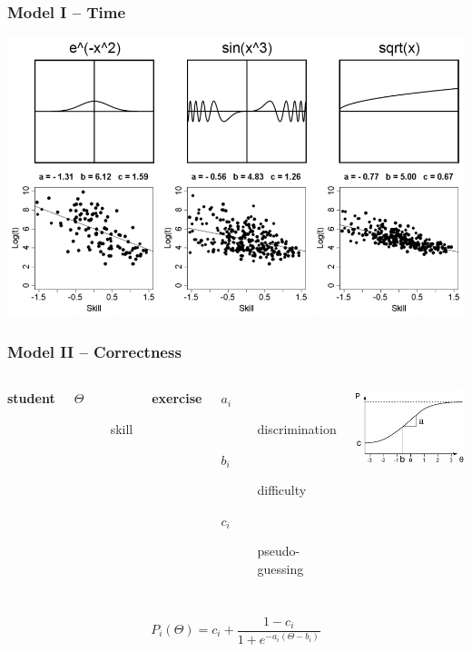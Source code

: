\documentclass[xcolor=svgnames]{beamer}
\begin{document}
\begin{frame}
	\frametitle{Model I -- Time}

	\begin{center}
		\includegraphics[width=.95\textwidth]{imgs/time-model-examples.png}
	\end{center}
\end{frame}
\begin{frame}
	\frametitle{Model II -- Correctness}
	\begin{columns}
		\textbf{student}
		\begin{description}
			\item[$\Theta$]	skill
		\end{description}
		\textbf{exercise}
		\begin{description}
			\item[$a_i$] discrimination
			\item[$b_i$] difficulty
			\item[$c_i$] pseudo-guessing
		\end{description}
		\includegraphics[width=\textwidth]{imgs/correctness-model.png}
	\end{columns}
	\begin{center}
		$$
		P_i(\Theta) = c_i + \frac{1 - c_i}{1 + e^{-a_i(\Theta - b_i)}}
		$$
	\end{center}
\end{frame}
\end{document}
